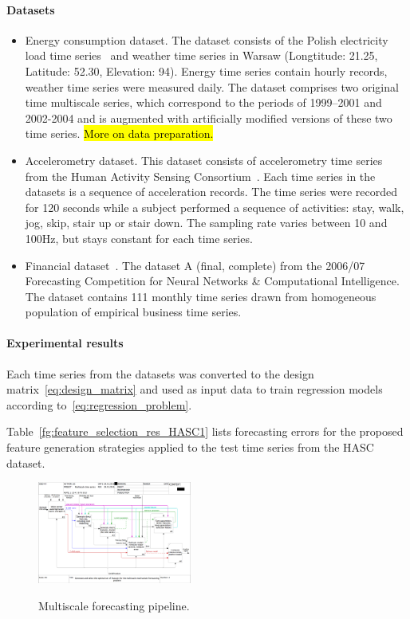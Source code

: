 \documentclass[conference]{IEEEtran}
\begin{document}
\paragraph{Datasets}
\begin{itemize}
\item Energy consumption dataset. The dataset consists of the Polish electricity load time series~\cite{EnergyWeatherData} and weather time series in Warsaw (Longtitude: 21.25, Latitude: 52.30, Elevation: 94). Energy time series contain hourly records, weather time series were measured daily. The dataset comprises two original time multiscale series, which correspond to the periods of 1999--2001 and 2002-2004 and is augmented with artificially modified versions of these two time series. \hl{More on data preparation.}
\item Accelerometry dataset. This dataset consists of accelerometry time series from the Human Activity Sensing Consortium~\cite{HASCdata}. Each time series in the datasets is a sequence of acceleration records. The time series were recorded for 120 seconds while a subject performed a sequence of activities: stay, walk, jog, skip, stair up or stair down. The sampling rate varies between 10 and 100Hz, but stays constant for each time series.
\item Financial dataset~\cite{NNcompetition}.  The dataset A (final, complete) from the 2006/07 Forecasting Competition for Neural Networks \& Computational Intelligence. The dataset contains 111 monthly time series drawn from homogeneous population of empirical business time series.
\end{itemize}

\paragraph{Experimental results}
Each time series from the datasets was converted to the design matrix~\eqref{eq:design_matrix} and used as input data to train regression models according to~\eqref{eq:regression_problem}. 

Table~\ref{fg:feature_selection_res_HASC1} lists forecasting errors for the proposed feature generation strategies applied to the test time series from the HASC dataset.
 



\begin{figure}[!t]
\centering\includegraphics[width=0.45\textwidth]{02_A0.png}
\label{fg:IDEF}
\caption{Multiscale forecasting pipeline.}
\end{figure}
\end{document}
